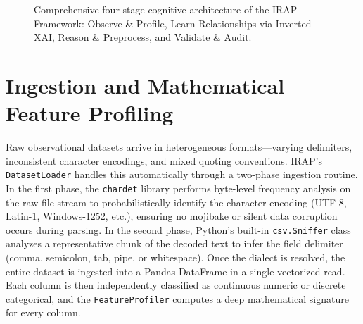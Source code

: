 \documentclass[MTech]{ugthesis}
\begin{document}
\begin{figure}[htpb]
{%
}
\caption{Comprehensive four-stage cognitive architecture of the IRAP Framework: Observe \& Profile, Learn Relationships via Inverted XAI, Reason \& Preprocess, and Validate \& Audit.}
\label{fig:irap_arch}
\end{figure}

\section{Ingestion and Mathematical Feature Profiling}
Raw observational datasets arrive in heterogeneous formats---varying delimiters, inconsistent character encodings, and mixed quoting conventions. IRAP's \texttt{DatasetLoader} handles this automatically through a two-phase ingestion routine. In the first phase, the \texttt{chardet} library performs byte-level frequency analysis on the raw file stream to probabilistically identify the character encoding (UTF-8, Latin-1, Windows-1252, etc.), ensuring no mojibake or silent data corruption occurs during parsing. In the second phase, Python's built-in \texttt{csv.Sniffer} class analyzes a representative chunk of the decoded text to infer the field delimiter (comma, semicolon, tab, pipe, or whitespace). Once the dialect is resolved, the entire dataset is ingested into a Pandas DataFrame in a single vectorized read. Each column is then independently classified as continuous numeric or discrete categorical, and the \texttt{FeatureProfiler} computes a deep mathematical signature for every column.
\end{document}
